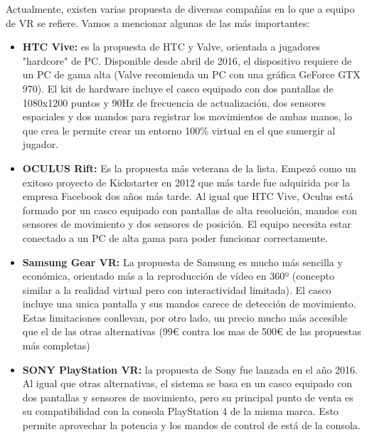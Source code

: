 Actualmente, existen varias propuesta de diversas compañías en lo que a equipo de VR se refiere. Vamos a mencionar algunas de las más importantes:
\begin{itemize}
\item \textbf{HTC Vive:} es la propuesta de HTC y Valve, orientada a jugadores "hardcore" de PC. Disponible desde abril de 2016, el dispositivo requiere de un PC de gama alta (Valve recomienda un PC con una gráfica GeForce GTX 970). El kit de hardware incluye el casco equipado con dos pantallas de 1080x1200 puntos y 90Hz de frecuencia de actualización, dos sensores espaciales y dos mandos para registrar los movimientos de ambas manos, lo que crea le permite crear un entorno 100\% virtual en el que sumergir al jugador.

\item \textbf{OCULUS Rift:} Es la propuesta más veterana de la lista. Empezó como un exitoso proyecto de Kickstarter en 2012 que más tarde fue adquirida por la empresa Facebook dos años más tarde. Al igual que HTC Vive, Oculus está formado por un casco equipado con pantallas de alta resolución, mandos con sensores de movimiento y dos sensores de posición. El equipo necesita estar conectado a un PC de alta gama para poder funcionar correctamente.

\item \textbf{Samsung Gear VR:} La propuesta de Samsung es mucho más sencilla y económica, orientado más a la reproducción de vídeo en 360º (concepto similar a la realidad virtual pero con interactividad limitada). El casco incluye una unica pantalla y sus mandos carece de detección de movimiento. Estas limitaciones conllevan, por otro lado, un precio mucho más accesible que el de las otras alternativas (99€ contra los mas de 500€ de las propuestas más completas)

\item \textbf{SONY PlayStation VR:} la propuesta de Sony fue lanzada en el año 2016. Al igual que otras alternativas, el sistema se basa en un casco equipado con dos pantallas y sensores de movimiento, pero su principal punto de venta es su compatibilidad con la consola PlayStation 4 de la misma marca. Esto permite aprovechar la potencia y los mandos de control de está de la consola.
\end{itemize}


